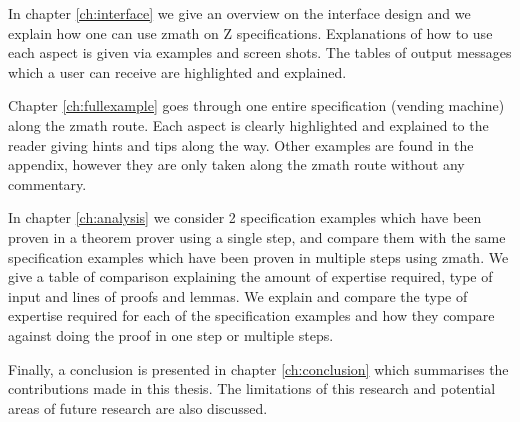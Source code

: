 In chapter \ref{ch:interface} we give an overview on the interface design and we explain how one can use \gls{zmath} on Z specifications. Explanations of how to use each aspect is given via examples and screen shots. The tables of output messages which a user can receive are highlighted and explained.

Chapter \ref{ch:fullexample} goes through one entire specification (vending machine) along the \gls{zmath} route. Each aspect is clearly highlighted and explained to the reader giving hints and tips along the way. Other examples are found in the appendix, however they are only taken along the \gls{zmath} route without any commentary.

In chapter \ref{ch:analysis} we consider 2 specification examples which have been proven in a theorem prover using a single step, and compare them with the same specification examples which have been proven in multiple steps using \gls{zmath}. We give a table of comparison explaining the amount of expertise required, type of input and lines of proofs and lemmas. We explain and compare the type of expertise required for each of the specification examples and how they compare against doing the proof in one step or multiple steps.

Finally, a conclusion is presented in chapter \ref{ch:conclusion} which summarises the contributions made in this thesis. The limitations of this research and potential areas of future research are also discussed.
